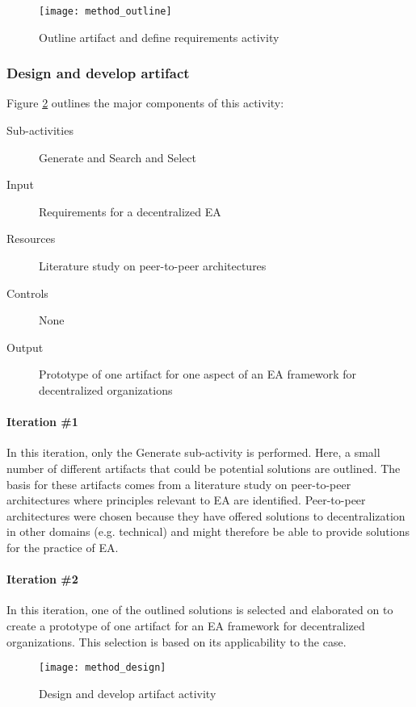 \begin{figure}
\texttt{[image: method\_outline]}
\caption{Outline artifact and define requirements activity}
\label{fig:method_outline}
\end{figure}

\subsubsection*{Design and develop artifact}

Figure \ref{fig:method_design} outlines the major components of this activity:
\begin{description}
  \item[Sub-activities] Generate and Search and Select ~\cite[Ch. 7]{johannessonPerjons2012}
  \item[Input]  Requirements for a decentralized EA 
  \item[Resources] Literature study on peer-to-peer architectures
  \item[Controls] None
  \item[Output] Prototype of one artifact for one aspect of an EA framework for decentralized organizations 
\end{description}

\paragraph{Iteration \#1}

In this iteration, only the Generate sub-activity is performed. Here, a small number of different artifacts that could be potential solutions are outlined. The basis for these artifacts comes from a literature study on peer-to-peer architectures where principles relevant to EA are identified. Peer-to-peer architectures were chosen because they have offered solutions to decentralization in other domains (e.g. technical) and might therefore be able to provide solutions for the practice of EA. 

\paragraph{Iteration \#2}

In this iteration, one of the outlined solutions is selected and elaborated on to create a prototype of one artifact for an EA framework for decentralized organizations. This selection is based on its applicability to the case. 

\begin{figure}
\texttt{[image: method\_design]}
\caption{Design and develop artifact activity}
\label{fig:method_design}
\end{figure}
  
